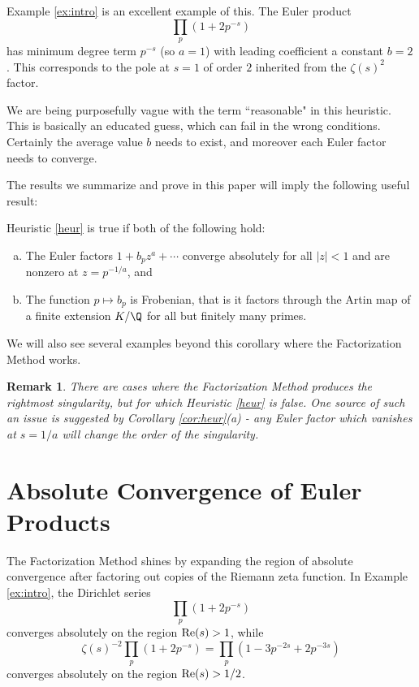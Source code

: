\documentclass[12pt]{amsart}
\newtheorem{remark}[theorem]{Remark}
\theoremstyle{plain}
\begin{document}
Example \ref{ex:intro} is an excellent example of this. The Euler product
\[
\prod_p (1 + 2p^{-s})
\]
has minimum degree term $p^{-s}$ (so $a=1$) with leading coefficient a constant $b=2$. This corresponds to the pole at $s=1$ of order $2$ inherited from the $\zeta(s)^2$ factor.

We are being purposefully vague with the term ``reasonable" in this heuristic. This is basically an educated guess, which can fail in the wrong conditions. Certainly the average value $b$ needs to exist, and moreover each Euler factor needs to converge.

The results we summarize and prove in this paper will imply the following useful result:
\begin{corollary}\label{cor:heur}
    Heuristic \ref{heur} is true if both of the following hold:
    \begin{enumerate}[(a)]
        \item The Euler factors $1 + b_pz^a + \cdots$ converge absolutely for all $|z|<1$ and are nonzero at $z=p^{-1/a}$, and
        \item The function $p\mapsto b_p$ is Frobenian, that is it factors through the Artin map of a finite extension $K/\Q$ for all but finitely many primes.
    \end{enumerate}
\end{corollary}

We will also see several examples beyond this corollary where the Factorization Method works.

\begin{remark}
    There are cases where the Factorization Method produces the rightmost singularity, but for which Heuristic \ref{heur} is false. One source of such an issue is suggested by Corollary \ref{cor:heur}(a) - any Euler factor which vanishes at $s=1/a$ will change the order of the singularity.
\end{remark}






\section{Absolute Convergence of Euler Products}
The Factorization Method shines by expanding the region of absolute convergence after factoring out copies of the Riemann zeta function. In Example \ref{ex:intro}, the Dirichlet series
\[
\prod_p (1 + 2p^{-s})
\]
converges absolutely on the region ${\rm Re}(s) > 1$, while
\[
\zeta(s)^{-2}\prod_p (1 + 2p^{-s}) = \prod_p ( 1-3p^{-2s}+2p^{-3s})
\]
converges absolutely on the region ${\rm Re}(s) > 1/2$.
\end{document}
